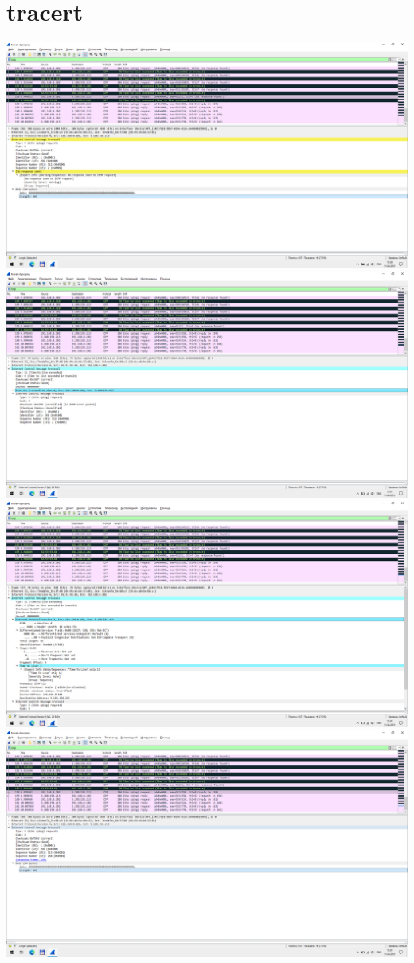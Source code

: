 \section{tracert}
\includegraphics{screenshots/tracert-d_ttl_request_1}
\includegraphics{screenshots/tracert-d_ttl_response_1}
\includegraphics{screenshots/tracert-d_ttl_response_2}
\includegraphics{screenshots/tracert-d_success_request_1}
